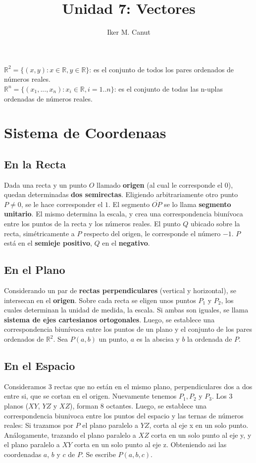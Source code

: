 \documentclass[11pt,a4paper]{article}
\author{Iker M. Canut}
\title{Unidad 7: Vectores}
\begin{document}
\maketitle
\newpage

\noindent $\mathbb{R}^2 = \{(x,y) : x\in\mathbb{R}, y\in\mathbb{R}\}$: es el conjunto de todos los pares ordenados de n\'umeros reales.\\
\noindent $\mathbb{R}^n = \{(x_1,...,x_n) : x_i\in\mathbb{R}, i=1..n\}$: es el conjunto de todas las n-uplas ordenadas de n\'umeros reales.

\section{Sistema de Coordenaas}
\subsection{En la Recta}
\noindent Dada una recta y un punto $O$ llamado \textbf{origen} (al cual le corresponde el 0), quedan determinadas \textbf{dos semirectas}. Eligiendo arbitrariamente otro punto $P\not=0$, se le hace corresponder el $1$. El segmento $\overline{OP}$ se lo llama \textbf{segmento unitario}. El mismo determina la escala, y crea una correspondencia biun\'ivoca entre los puntos de la recta y los n\'umeros reales. El punto $Q$ ubicado sobre la recta, sim\'etricamente a $P$ respecto del origen, le corresponde el n\'umero $-1$. $P$ est\'a en el \textbf{semieje positivo}, $Q$ en el \textbf{negativo}.
\subsection{En el Plano}
Considerando un par de \textbf{rectas perpendiculares} (vertical y horizontal), se intersecan en el \textbf{origen}. Sobre cada recta se eligen unos puntos $P_1$ y $P_2$, los cuales determinan la unidad de medida, la escala. Si ambas son iguales, se llama \textbf{sistema de ejes cartesianos ortogonales}. Luego, se establece una correspondencia biunívoca entre los puntos de un plano y el conjunto de los pares ordenados de $\mathbb{R}^2$. Sea $P(a,b)$ un punto, $a$ es la abscisa y $b$ la ordenada de $P$.
\subsection{En el Espacio}
Consideramos 3 rectas que no est\'an en el mismo plano, perpendiculares dos a dos entre si, que se cortan en el origen. Nuevamente tenemos $P_1, P_2$ y $P_3$. Los 3 planos ($XY$, $YZ$ y $XZ$), forman 8 octantes. Luego, se establece una correspondencia biunivoca entre los puntos del espacio y las ternas de n\'umeros reales: Si trazamos por $P$ el plano paralelo a $YZ$, corta al eje x en un solo punto. An\'alogamente, trazando el plano paralelo a $XZ$ corta en un solo punto al eje y, y el plano paralelo a $XY$ corta en un solo punto al eje z. Obteniendo asi las coordenadas $a$, $b$ y $c$ de $P$. Se escribe $P(a,b,c)$.
\end{document}

